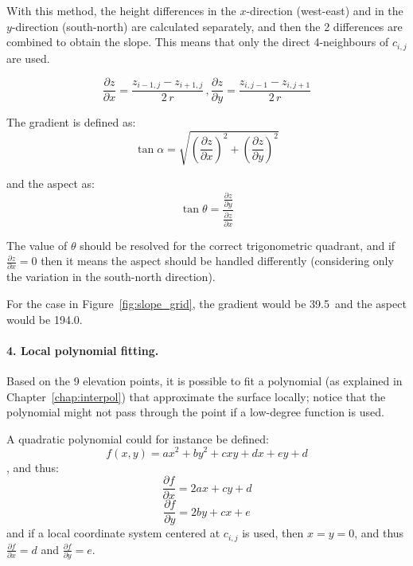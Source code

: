 With this method, the height differences in the $x$-direction (west-east) and in the $y$-direction (south-north) are calculated separately, and then the 2 differences are combined to obtain the slope.
This means that only the direct 4-neighbours of $c_{i,j}$ are used.

\begin{equation}
  \frac{\partial z}{\partial x} = \frac{z_{i-1,j} - z_{i+1,j}}{2\,r}
\, , 
  \frac{\partial z}{\partial y} = \frac{z_{i,j-1} - z_{i,j+1}}{2\,r}
\end{equation}

The gradient is defined as:
\begin{equation}
  \tan \alpha = \sqrt{(\frac{\partial z}{\partial x})^2 + (\frac{\partial z}{\partial y})^2}
\end{equation}

and the aspect as:
\begin{equation}
  \tan \theta = \frac{\frac{\partial z}{\partial y}}{\frac{\partial z}{\partial x}}
\end{equation}

The value of $\theta$ should be resolved for the correct trigonometric quadrant, and if $\frac{\partial z}{\partial x} = 0$ then it means the aspect should be handled differently (considering only the variation in the south-north direction). 

For the case in Figure~\ref{fig:slope_grid}, the gradient would be 39.5\degree\ and the aspect would be 194.0\degree.


\paragraph{4. Local polynomial fitting.}%
\label{sec:polynomial}

Based on the 9 elevation points, it is possible to fit a polynomial (as explained in Chapter~\ref{chap:interpol}) that approximate the surface locally; notice that the polynomial might not pass through the point if a low-degree function is used.

A quadratic polynomial could for instance be defined:
\begin{equation}
  f(x,y) = ax^2 + by^2 + cxy + dx + ey +d
\end{equation}
, and thus:
\begin{equation}
  \frac{\partial f}{\partial x} = 2ax + cy + d
\end{equation}
\begin{equation}
  \frac{\partial f}{\partial y} = 2by + cx + e
\end{equation}
and if a local coordinate system centered at $c_{i,j}$ is used, then $x = y = 0$, and thus $\frac{\partial f}{\partial x} = d$ and $\frac{\partial f}{\partial y} = e$.


